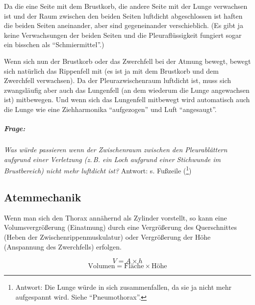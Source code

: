 Da die eine Seite mit dem Brustkorb, die andere Seite mit der Lunge
verwachsen ist und der Raum zwischen den beiden Seiten luftdicht
abgeschlossen ist haften die beiden Seiten aneinander, aber sind
gegeneinander verschieblich. (Es gibt ja keine
Verwachsungen der beiden Seiten und die Pleuraflüssigkeit fungiert sogar ein
bisschen als "`Schmiermittel"'.) 

Wenn sich nun der Brustkorb oder das Zwerchfell bei der
Atmung bewegt, bewegt sich natürlich das Rippenfell mit (es ist ja mit dem Brustkorb
und dem Zwerchfell verwachsen). Da der Pleurazwischenraum
luftdicht ist, muss sich zwangsläufig aber auch das Lungenfell (an dem
wiederum die Lunge angewachsen ist) mitbewegen. Und wenn sich das Lungenfell
mitbewegt wird automatisch auch die Lunge wie eine Ziehharmonika
"`aufgezogen"' und Luft
"`angesaugt"'. 

\subparagraph{Frage:} \emph{Was würde passieren wenn der
Zwischenraum zwischen den Pleurablättern aufgrund einer Verletzung (z.\,B. ein
Loch aufgrund einer Stichwunde im Brustbereich) nicht mehr luftdicht
ist?} Antwort: s. Fußzeile (\footnote{Antwort: Die Lunge
würde in sich zusammenfallen, da sie ja nicht mehr aufgespannt wird. Siehe
"`Pneumothorax"'. })



\subsection{Atemmechanik}
\label{topic:atemmechanik}  

Wenn man sich den Thorax annähernd als Zylinder vorstellt,
so kann eine Volumsvergrößerung (Einatmung) durch eine
Vergrößerung des Querschnittes (Heben der
Zwischenrippenmuskulatur)
oder Vergrößerung der Höhe (Anspannung des Zwerchfells) erfolgen.

\begin{equation}
V = A \times h
\end{equation}
\begin{equation}
\mbox{Volumen} = \mbox{Fläche} \times \mbox{Höhe}
\end{equation}


